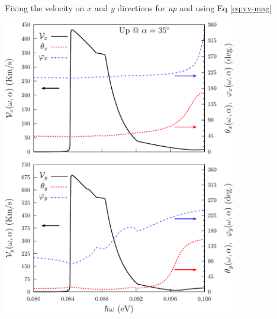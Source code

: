 \documentclass{beamer}
\begin{document}


\begin{frame}

\begin{columns}


\begin{center}

\vspace{-3mm}
{\small Fixing the velocity on $x$ and $y$ directions for \emph{up} and using
Eq \eqref{eq:vv-mag} }


\includegraphics[width=0.80\textwidth]{figs/fig7.pdf}

\end{center}  


\vspace{-10mm}

\begin{center}


\end{center}
\end{columns}
\end{frame}
\end{document}
